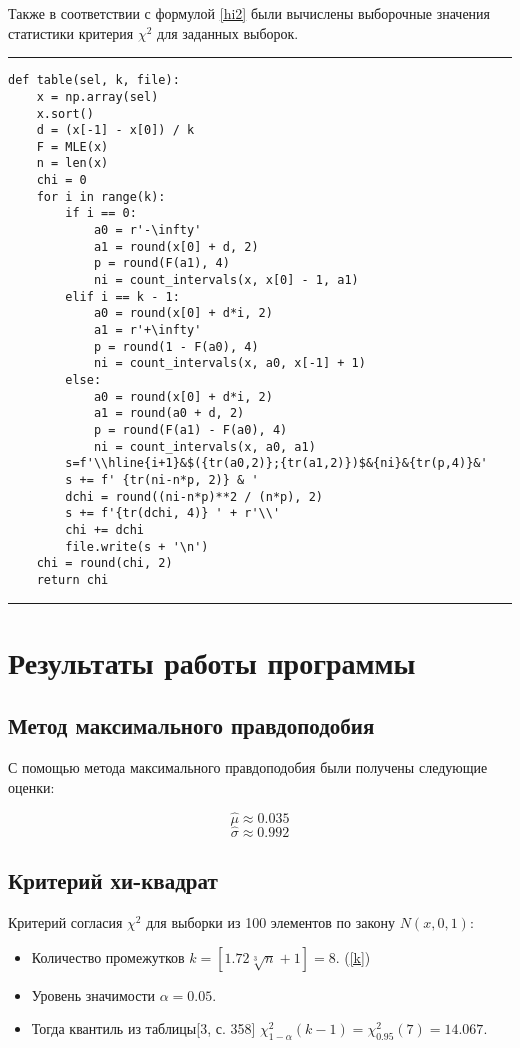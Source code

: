 \documentclass[12pt]{article}
\begin{document}
	\vskip 0.5cm 
	Также в соответствии с формулой \eqref{hi2} были вычислены выборочные значения статистики критерия $\chi^2$ для заданных выборок.
	\vskip 0.3cm
\hrule width 16cm height 1pt
\begin{verbatim}	 
def table(sel, k, file):
    x = np.array(sel)
    x.sort()
    d = (x[-1] - x[0]) / k
    F = MLE(x)
    n = len(x)
    chi = 0
    for i in range(k):
        if i == 0:
            a0 = r'-\infty'
            a1 = round(x[0] + d, 2)
            p = round(F(a1), 4)
            ni = count_intervals(x, x[0] - 1, a1)
        elif i == k - 1:
            a0 = round(x[0] + d*i, 2)
            a1 = r'+\infty'
            p = round(1 - F(a0), 4)
            ni = count_intervals(x, a0, x[-1] + 1)
        else:
            a0 = round(x[0] + d*i, 2)
            a1 = round(a0 + d, 2)
            p = round(F(a1) - F(a0), 4)
            ni = count_intervals(x, a0, a1)
        s=f'\\hline{i+1}&$({tr(a0,2)};{tr(a1,2)})$&{ni}&{tr(p,4)}&'
        s += f' {tr(ni-n*p, 2)} & '
        dchi = round((ni-n*p)**2 / (n*p), 2)
        s += f'{tr(dchi, 4)} ' + r'\\'
        chi += dchi
        file.write(s + '\n')
    chi = round(chi, 2)
    return chi
\end{verbatim}
\hrule width 16cm height 1pt
    
\newpage

\section{Результаты работы программы}
\subsection{Метод максимального правдоподобия}
	С помощью метода максимального правдоподобия были получены следующие оценки:
	
	$$\hat{\mu} \approx 0.035$$$$ \hat{\sigma} \approx 0.992$$
	
\subsection{Критерий хи-квадрат}
Критерий согласия $\chi^2$ для выборки из 100 элементов по закону $N(x,0,1)$:
\begin{itemize}
	\item Количество промежутков $k = [1.72\sqrt[3]{n}+1] = 8$. (\ref{k})
	\item Уровень значимости $\alpha = 0.05$.
	\item Тогда квантиль из таблицы[3, с. 358] $\chi^2_{1-\alpha}(k-1) = \chi^2_{0.95}(7) = 14.067$.
\end{itemize}
\end{document}
